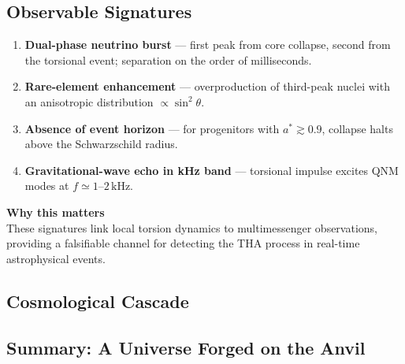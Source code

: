 \documentclass{article}
\begin{document}
\subsection{Observable Signatures}
\label{subsec:THF-observables}

\begin{enumerate}[label=\textbf{\arabic*.}, wide]
  \item \textbf{Dual-phase neutrino burst} --- first peak from core collapse, second from the torsional event; separation on the order of milliseconds.
  \item \textbf{Rare-element enhancement} --- overproduction of third-peak nuclei with an anisotropic distribution $\propto \sin^2\theta$.
  \item \textbf{Absence of event horizon} --- for progenitors with $a^* \gtrsim 0.9$, collapse halts above the Schwarzschild radius.
  \item \textbf{Gravitational-wave echo in kHz band} --- torsional impulse excites QNM modes at $f \simeq 1$--$2\,\text{kHz}$.
\end{enumerate}


\begin{tcolorbox}[
  colback=white,
  colframe=black!30,
  boxrule=0.3pt,
  arc=2pt,
  left=6pt,
  right=6pt,
  top=4pt,
  bottom=4pt,
  enhanced
]
\textbf{Why this matters} \\
\vspace{2pt}
These signatures link local torsion dynamics to multimessenger observations, providing a falsifiable channel for detecting the THA process in real-time astrophysical events.
\end{tcolorbox}




\subsection{Cosmological Cascade}
\label{subsec:THF-cascade}

\begin{center}
\end{center}

\subsection{Summary: A Universe Forged on the Anvil}
\label{subsec:THF-summary}
\end{document}
